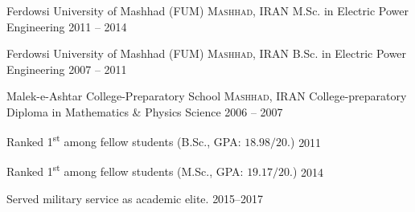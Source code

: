 \documentclass[10pt,a4paper]{article}
\begin{document}
\headedsection
{Ferdowsi University of Mashhad (FUM)}
{\textsc{Mashhad, IRAN}} {
    \headedsubsection
    {M.Sc. in Electric Power Engineering}
    {2011 -- 2014}
    {}
}

\headedsection
{Ferdowsi University of Mashhad (FUM)}
{\textsc{Mashhad, IRAN}} {
    \headedsubsection
    {B.Sc. in Electric Power Engineering}
    {2007 -- 2011}
    {}
}

\headedsection
{Malek-e-Ashtar College-Preparatory School}
{\textsc{Mashhad, IRAN}} {
    \headedsubsection
    {College-preparatory Diploma in Mathematics \& Physics Science}
    {2006 -- 2007}
    {}
}
\spacedhrule{1.6em}{-0.4em}

\headedsection
{Ranked 1\textsuperscript{st} among fellow students (B.Sc., GPA: $18.98/20$.)}
{2011}{}

\headedsection
{Ranked 1\textsuperscript{st} among fellow students (M.Sc., GPA: $19.17/20$.)}
{2014}{}

\headedsection
{Served military service as academic elite.}
{2015--2017}{}

\spacedhrule{0.5em}{-0.4em}




{}
\end{document}
